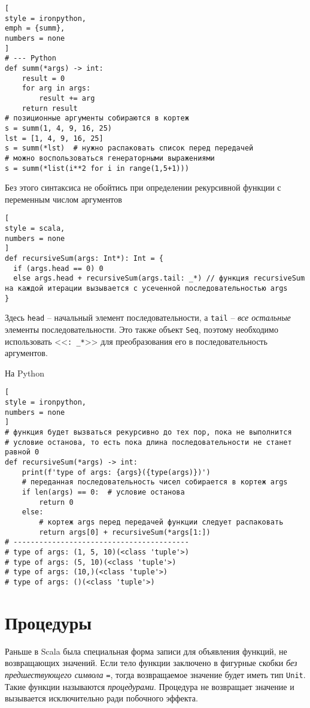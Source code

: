 \documentclass[%
	11pt,
	a4paper,
	utf8,
		]{article}
\begin{document}
\begin{lstlisting}[
style = ironpython,
emph = {summ},
numbers = none
]
# --- Python
def summ(*args) -> int:
    result = 0
    for arg in args:
        result += arg
    return result
# позиционные аргументы собираются в кортеж
s = summ(1, 4, 9, 16, 25)
lst = [1, 4, 9, 16, 25]
s = summ(*lst)  # нужно распаковать список перед передачей
# можно воспользоваться генераторными выражениями
s = summ(*list(i**2 for i in range(1,5+1)))
\end{lstlisting}

Без этого синтаксиса не обойтись при определении рекурсивной функции с переменным числом аргументов
\begin{lstlisting}[
style = scala,
numbers = none
]
def recursiveSum(args: Int*): Int = {
  if (args.head == 0) 0
  else args.head + recursiveSum(args.tail: _*) // функция recursiveSum на каждой итерации вызывается с усеченной последовательностью args
}
\end{lstlisting}

Здесь \texttt{head} -- начальный элемент последовательности, а \texttt{tail} -- \emph{все остальные} элементы последовательности. Это также объект \texttt{Seq}, поэтому необходимо использовать <<\verb|: _*|>> для преобразования его в последовательность аргументов.

На Python
\begin{lstlisting}[
style = ironpython,
numbers = none
]
# функция будет вызваться рекурсивно до тех пор, пока не выполнится
# условие останова, то есть пока длина последовательности не станет равной 0
def recursiveSum(*args) -> int: 
    print(f'type of args: {args}({type(args)})')
    # переданная последовательность чисел собирается в кортеж args
    if len(args) == 0:  # условие останова
        return 0
    else:
        # кортеж args перед передачей функции следует распаковать
        return args[0] + recursiveSum(*args[1:])
# -----------------------------------------
# type of args: (1, 5, 10)(<class 'tuple'>)
# type of args: (5, 10)(<class 'tuple'>)
# type of args: (10,)(<class 'tuple'>)
# type of args: ()(<class 'tuple'>)
\end{lstlisting}

\section{Процедуры}

Раньше в Scala была специальная форма записи для объявления функций, не возвращающих значений. Если тело функции заключено в фигурные скобки \emph{без предшествующего символа} \texttt{=}, тогда возвращаемое значение будет иметь тип \texttt{Unit}. Такие функции называются \emph{процедурами}. Процедура не возвращает значение и вызывается исключительно ради побочного эффекта.
\end{document}
